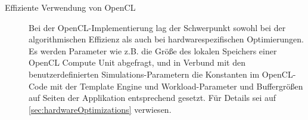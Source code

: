\begin{description}
	
	\item[Effiziente Verwendung von OpenCL]
		Bei der OpenCL-Implementierung lag der Schwerpunkt sowohl bei der algorithmischen Effizienz
		als auch bei hardwarespezifischen Optimierungen. Es werden Parameter wie z.B. die Größe
		des lokalen Speichers einer OpenCL Compute Unit abgefragt, und in Verbund mit den benutzerdefinierten
		Simulations-Parametern die Konstanten im OpenCL-Code mit der 
		Template Engine und Workload-Parameter und Buffergrößen auf Seiten der Applikation entsprechend gesetzt.
		Für Details sei auf \ref{sec:hardwareOptimizations} verwiesen.



\end{description}
	
	
\clearpage
